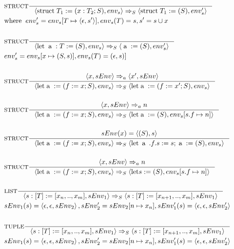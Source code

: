 \begin{align*}
&\inference[$\text{STRUCT}$]{}
                            {\Braket{\Tstruct T_1 := (x:T_2;S), env_s} \Rightarrow_S \Braket{\Tstruct T_1 := (S),env_s'}}
\\
&{\Twhere env_s' = env_s[T \mapsto \Braket{\epsilon,s'}],env_s(T) = s,s' = s \cup x}
\\\\
&\inference[$\text{STRUCT}$]{}
                            {\Braket{\Tlet \; \Ta:T := (S),env_s} \Rightarrow_S \Braket{\Ta := (S),env_s'}}
\\
&{env_s' = env_s[x \mapsto (S,s)],env_s(T) = (\epsilon,s)]}
\\\\
&\inference[$\text{STRUCT}$]{\Braket{x,sEnv} \Rightarrow_a \Braket{x',sEnv}}
                            {\Braket{\Tlet \Ta := (f := x;S),env_s} \Rightarrow_S \Braket{\Tlet \Ta := (f := x';S),env_s}}
\\\\
&\inference[$\text{STRUCT}$]{\Braket{x,sEnv} \Rightarrow_a n}
                            {\Braket{\Tlet \Ta := (f := x;S),env_s} \Rightarrow_S \Braket{\Tlet \Ta := (S),env_s[s.f \mapsto {n}]}}
\\\\
&\inference[$\text{STRUCT}$]{sEnv(x) = \Braket{(S),s}}
                            {\Braket{\Tlet \Ta := (f := x;S),env_s} \Rightarrow_S \Braket{\Tlet \Ta.f.s := s;\Ta := (S),env_s}}
\\\\
&\inference[$\text{STRUCT}$]{\Braket{x,sEnv} \Rightarrow_a n}
                            {\Braket{\Tlet \Ta := (f := x;S),env_s} \Rightarrow_S \Braket{\Tlet s := (S),env_s[s.f \mapsto {n}]}}
\\\\
&\inference[$\text{LIST}$]{}
                            {\Braket{s:[T] := [x_n,..,x_m],sEnv_1} \Rightarrow_S \Braket{s:[T] := [x_{n+1},..,x_m],sEnv_1}}
\\
&{sEnv_1(s) = \Braket{\epsilon,\epsilon,sEnv_2},sEnv_2' = sEnv_2[n \mapsto x_n],sEnv_1'(s) = \Braket{\epsilon,\epsilon,sEnv_2'}}
\\\\
&\inference[$\text{TUPLE}$]{}
                           {\Braket{s:[T] := [x_n,..,x_m],sEnv_1} \Rightarrow_S \Braket{s:[T] := [x_{n+1},..,x_m],sEnv_1}}
\\
&{sEnv_1(s) = \Braket{\epsilon,\epsilon,sEnv_2},sEnv_2' = sEnv_2[n \mapsto x_n],sEnv_1'(s) = \Braket{\epsilon,\epsilon,sEnv_2'}}
\end{align*}

